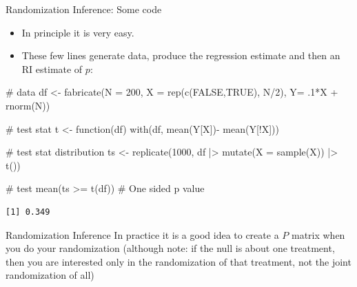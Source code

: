 \documentclass[
  11pt,
  ignorenonframetext,
]{beamer}
\newenvironment{Shaded}{\begin{snugshade}}{\end{snugshade}}
\newcommand{\AttributeTok}[1]{\textcolor[rgb]{0.40,0.45,0.13}{#1}}
\newcommand{\CommentTok}[1]{\textcolor[rgb]{0.37,0.37,0.37}{#1}}
\newcommand{\ConstantTok}[1]{\textcolor[rgb]{0.56,0.35,0.01}{#1}}
\newcommand{\ControlFlowTok}[1]{\textcolor[rgb]{0.00,0.23,0.31}{#1}}
\newcommand{\DecValTok}[1]{\textcolor[rgb]{0.68,0.00,0.00}{#1}}
\newcommand{\FunctionTok}[1]{\textcolor[rgb]{0.28,0.35,0.67}{#1}}
\newcommand{\NormalTok}[1]{\textcolor[rgb]{0.00,0.23,0.31}{#1}}
\newcommand{\OtherTok}[1]{\textcolor[rgb]{0.00,0.23,0.31}{#1}}
\newcommand{\SpecialCharTok}[1]{\textcolor[rgb]{0.37,0.37,0.37}{#1}}
\providecommand{\tightlist}{%
  \setlength{\itemsep}{0pt}\setlength{\parskip}{0pt}}\usepackage{longtable,booktabs,array}
\begin{document}
\begin{frame}[fragile]{Randomization Inference: Some code}
\protect\hypertarget{randomization-inference-some-code}{}
\begin{itemize}
\tightlist
\item
  In principle it is very easy.
\item
  These few lines generate data, produce the regression estimate and
  then an RI estimate of \(p\):
\end{itemize}

\begin{Shaded}
\begin{Highlighting}[]
\CommentTok{\# data}
\NormalTok{df }\OtherTok{\textless{}{-}} \FunctionTok{fabricate}\NormalTok{(}\AttributeTok{N =} \DecValTok{200}\NormalTok{, }\AttributeTok{X =} \FunctionTok{rep}\NormalTok{(}\FunctionTok{c}\NormalTok{(}\ConstantTok{FALSE}\NormalTok{,}\ConstantTok{TRUE}\NormalTok{), N}\SpecialCharTok{/}\DecValTok{2}\NormalTok{), }\AttributeTok{Y=}\NormalTok{  .}\DecValTok{1}\SpecialCharTok{*}\NormalTok{X }\SpecialCharTok{+} \FunctionTok{rnorm}\NormalTok{(N))}

\CommentTok{\# test stat}
\NormalTok{t }\OtherTok{\textless{}{-}} \ControlFlowTok{function}\NormalTok{(df) }\FunctionTok{with}\NormalTok{(df, }\FunctionTok{mean}\NormalTok{(Y[X])}\SpecialCharTok{{-}} \FunctionTok{mean}\NormalTok{(Y[}\SpecialCharTok{!}\NormalTok{X]))}

\CommentTok{\# test stat distribution}
\NormalTok{ts }\OtherTok{\textless{}{-}} \FunctionTok{replicate}\NormalTok{(}\DecValTok{1000}\NormalTok{, df }\SpecialCharTok{|\textgreater{}} \FunctionTok{mutate}\NormalTok{(}\AttributeTok{X =} \FunctionTok{sample}\NormalTok{(X)) }\SpecialCharTok{|\textgreater{}} \FunctionTok{t}\NormalTok{())}

\CommentTok{\# test}
\FunctionTok{mean}\NormalTok{(ts }\SpecialCharTok{\textgreater{}=} \FunctionTok{t}\NormalTok{(df))   }\CommentTok{\# One sided p value}
\end{Highlighting}
\end{Shaded}

\begin{verbatim}
[1] 0.349
\end{verbatim}
\end{frame}

\begin{frame}{Randomization Inference}
\protect\hypertarget{randomization-inference-1}{}
In practice it is a good idea to create a \(P\) matrix when you do your
randomization (although note: if the null is about one treatment, then
you are interested only in the randomization of that treatment, not the
joint randomization of all)
\end{frame}
\end{document}
